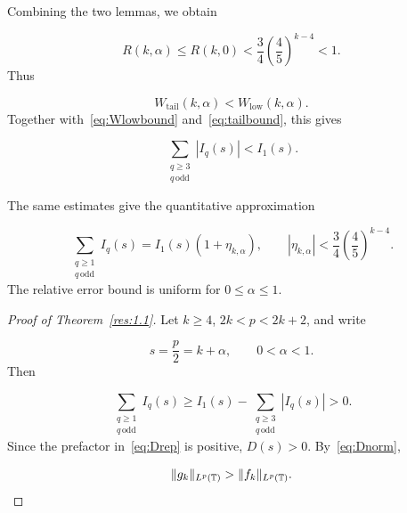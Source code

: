 \documentclass[11pt]{article}
\theoremstyle{plain}
\theoremstyle{definition}
\theoremstyle{remark}
\begin{document}
Combining the two lemmas, we obtain

\[
  R(k,\alpha ) \le R(k,0) < \frac{3}{4}\left( \frac{4}{5} \right)^{k-4} < 1 .
\]
Thus

\[
  W_{\mathrm{tail}}(k,\alpha ) < W_{\mathrm{low}}(k,\alpha ) .
\]
Together with~\eqref{eq:Wlowbound} and~\eqref{eq:tailbound}, this gives

\[
  \sum_{\substack{q \ge 3 \\ q \,\mathrm{odd}}} |I_q(s)| < I_{1}(s) .
\]

The same estimates give the quantitative approximation

\begin{equation}\label{eq:approx}
  \sum_{\substack{q \ge 1 \\ q \,\mathrm{odd}}} I_q(s) = I_{1}(s)(1 + \eta_{k,\alpha }) , \qquad  |\eta_{k,\alpha }| < \frac{3}{4}\left( \frac{4}{5} \right)^{k-4} .
\end{equation}
The relative error bound is uniform for $0 \le \alpha \le 1$.

\begin{proof}[Proof of Theorem~\ref{res:1.1}]
Let $k \ge 4$, $2k < p < 2k+2$, and write

\[
  s = \frac{p}{2} = k+\alpha , \qquad  0 < \alpha < 1 .
\]
Then

\[
  \sum_{\substack{q \ge 1 \\ q \,\mathrm{odd}}} I_q(s) \ge I_{1}(s) - \sum_{\substack{q \ge 3 \\ q \,\mathrm{odd}}} |I_q(s)| > 0 .
\]
Since the prefactor in~\eqref{eq:Drep} is positive, $D(s) > 0$. By~\eqref{eq:Dnorm},

\[
  \|g_k\|_{L^p(\mathbb{T})} > \|f_k\|_{L^p(\mathbb{T})} . \qedhere
\]
\end{proof}
\end{document}
